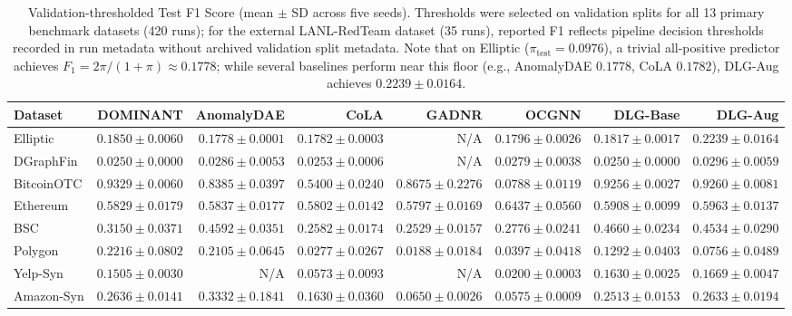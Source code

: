 \documentclass[applsci,article,submit,moreauthors,pdftex]{Definitions/mdpi}
\begin{document}
\begin{table}[H]
\centering\fontsize{7.2pt}{8.5pt}\selectfont\setlength{\tabcolsep}{1.2pt}
\caption{Validation-thresholded Test F1 Score (mean $\pm$ SD across five seeds). Thresholds were selected on validation splits for all 13 primary benchmark datasets (420 runs); for the external LANL-RedTeam dataset (35 runs), reported F1 reflects pipeline decision thresholds recorded in run metadata without archived validation split metadata. Note that on Elliptic ($\pi_{\mathrm{test}} = 0.0976$), a trivial all-positive predictor achieves $F_1 = 2\pi / (1+\pi) \approx 0.1778$; while several baselines perform near this floor (e.g., AnomalyDAE $0.1778$, CoLA $0.1782$), DLG-Aug achieves $0.2239 \pm 0.0164$.}
\label{tab:app_f1_full}
\begin{tabular*}{\textwidth}{@{\extracolsep{\fill}}lrrrrrrr}\toprule
\textbf{Dataset} & \textbf{DOMINANT} & \textbf{AnomalyDAE} & \textbf{CoLA} & \textbf{GADNR} & \textbf{OCGNN} & \textbf{DLG-Base} & \textbf{DLG-Aug} \\\midrule
Elliptic & $0.1850 \pm 0.0060$ & $0.1778 \pm 0.0001$ & $0.1782 \pm 0.0003$ & N/A & $0.1796 \pm 0.0026$ & $0.1817 \pm 0.0017$ & $\mathbf{0.2239 \pm 0.0164}$ \\
DGraphFin & $0.0250 \pm 0.0000$ & $0.0286 \pm 0.0053$ & $0.0253 \pm 0.0006$ & N/A & $0.0279 \pm 0.0038$ & $0.0250 \pm 0.0000$ & $\mathbf{0.0296 \pm 0.0059}$ \\
BitcoinOTC & $\mathbf{0.9329 \pm 0.0060}$ & $0.8385 \pm 0.0397$ & $0.5400 \pm 0.0240$ & $0.8675 \pm 0.2276$ & $0.0788 \pm 0.0119$ & $0.9256 \pm 0.0027$ & $0.9260 \pm 0.0081$ \\
Ethereum & $0.5829 \pm 0.0179$ & $0.5837 \pm 0.0177$ & $0.5802 \pm 0.0142$ & $0.5797 \pm 0.0169$ & $\mathbf{0.6437 \pm 0.0560}$ & $0.5908 \pm 0.0099$ & $0.5963 \pm 0.0137$ \\
BSC & $0.3150 \pm 0.0371$ & $0.4592 \pm 0.0351$ & $0.2582 \pm 0.0174$ & $0.2529 \pm 0.0157$ & $0.2776 \pm 0.0241$ & $\mathbf{0.4660 \pm 0.0234}$ & $0.4534 \pm 0.0290$ \\
Polygon & $\mathbf{0.2216 \pm 0.0802}$ & $0.2105 \pm 0.0645$ & $0.0277 \pm 0.0267$ & $0.0188 \pm 0.0184$ & $0.0397 \pm 0.0418$ & $0.1292 \pm 0.0403$ & $0.0756 \pm 0.0489$ \\
Yelp-Syn & $0.1505 \pm 0.0030$ & N/A & $0.0573 \pm 0.0093$ & N/A & $0.0200 \pm 0.0003$ & $0.1630 \pm 0.0025$ & $\mathbf{0.1669 \pm 0.0047}$ \\
Amazon-Syn & $0.2636 \pm 0.0141$ & $\mathbf{0.3332 \pm 0.1841}$ & $0.1630 \pm 0.0360$ & $0.0650 \pm 0.0026$ & $0.0575 \pm 0.0009$ & $0.2513 \pm 0.0153$ & $0.2633 \pm 0.0194$ \\

\end{tabular*}
\end{table}
\end{document}
